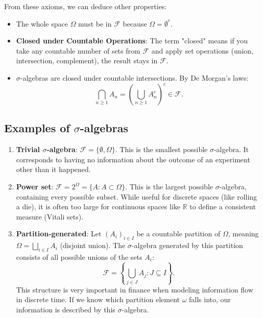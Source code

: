 \begin{remark}
From these axioms, we can deduce other properties:
\begin{itemize}
    \item The whole space $\Omega$ must be in $\mathcal{F}$ because $\Omega = \emptyset^c$.
    \item \textbf{Closed under Countable Operations}: The term "closed" means if you take any countable number of sets from $\mathcal{F}$ and apply set operations (union, intersection, complement), the result stays in $\mathcal{F}$.
    \item \texorpdfstring{$\sigma$-}{sigma-}algebras are closed under countable intersections. By De Morgan's laws:
    \[
    \bigcap_{n \geq 1} A_n = \left( \bigcup_{n \geq 1} A_n^c \right)^c \in \mathcal{F}.
    \]
\end{itemize}
\end{remark}

\subsection{Examples of \texorpdfstring{$\sigma$-}{sigma-}algebras}
\begin{enumerate}
    \item \textbf{Trivial \texorpdfstring{$\sigma$-}{sigma-}algebra}: $\mathcal{F} = \{ \emptyset, \Omega \}$. This is the smallest possible \texorpdfstring{$\sigma$-}{sigma-}algebra. It corresponds to having no information about the outcome of an experiment other than it happened.
    \item \textbf{Power set}: $\mathcal{F} = 2^{\Omega} = \{ A : A \subset \Omega \}$. This is the largest possible \texorpdfstring{$\sigma$-}{sigma-}algebra, containing every possible subset. While useful for discrete spaces (like rolling a die), it is often too large for continuous spaces like $\mathbb{R}$ to define a consistent measure (Vitali sets).
    \item \textbf{Partition-generated}: Let $(A_i)_{i \in I}$ be a countable partition of $\Omega$, meaning $\Omega = \bigsqcup_{i \in I} A_i$ (disjoint union). The \texorpdfstring{$\sigma$-}{sigma-}algebra generated by this partition consists of all possible unions of the sets $A_i$:
    \[
    \mathcal{F} = \left\{ \bigcup_{j \in J} A_j : J \subseteq I \right\}.
    \]
    This structure is very important in finance when modeling information flow in discrete time. If we know which partition element $\omega$ falls into, our information is described by this \texorpdfstring{$\sigma$-}{sigma-}algebra.
\end{enumerate}

